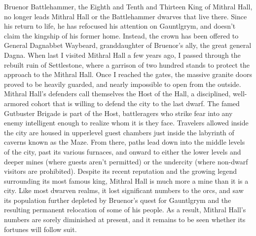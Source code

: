 \documentclass[10pt,a4paper,twoside,twocolumn,openany,bg=print,nodeprecatedcode]{dndbook}
\begin{document}
Bruenor Battlehammer, the Eighth and Tenth and Thirteen King of Mithral Hall, no longer leads Mithral Hall or the Battlehammer dwarves that live there. Since his return to life, he has refocused his attention on Gauntlgrym, and doesn't claim the kingship of his former home. Instead, the crown has been offered to General Dagnabbet Waybeard, granddaughter of Bruenor's ally, the great general Dagna.
When last I visited Mithral Hall a few years ago, I passed through the rebuilt ruin of Settlestone, where a garrison of two hundred stands to protect the approach to the Mithral Hall. Once I reached the gates, the massive granite doors proved to be heavily guarded, and nearly impossible to open from the outside. Mithral Hall's defenders call themselves the Host of the Hall, a disciplined, well-armored cohort that is willing to defend the city to the last dwarf. The famed Gutbuster Brigade is part of the Host, battleragers who strike fear into any enemy intelligent enough to realize whom it is they face.
Travelers allowed inside the city are housed in upperlevel guest chambers just inside the labyrinth of caverns known as the Maze. From there, paths lead down into the middle levels of the city, past its various furnaces, and onward to either the lower levels and deeper mines (where guests aren't permitted) or the undercity (where non-dwarf visitors are prohibited).
Despite its recent reputation and the growing legend surrounding its most famous king, Mithral Hall is much more a mine than it is a city. Like most dwarven realms, it lost significant numbers to the orcs, and saw its population further depleted by Bruenor's quest for Gauntlgrym and the resulting permanent relocation of some of his people. As a result, Mithral Hall's numbers are sorely diminished at present, and it remains to be seen whether its fortunes will follow suit.
\end{document}
